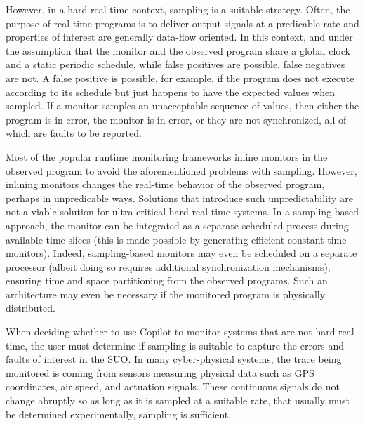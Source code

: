 However, in a hard real-time context, sampling is a suitable strategy.  Often,
the purpose of real-time programs is to deliver output signals at a predicable
rate and properties of interest are generally data-flow oriented.  In this
context, and under the assumption that the monitor and the observed program
share a global clock and a static periodic schedule, while false positives are
possible, false negatives are not.  A false positive is possible, for example,
if the program does not execute according to its schedule but just happens to
have the expected values when sampled.  If a monitor samples an unacceptable
sequence of values, then either the program is in error, the monitor is in
error, or they are not synchronized, all of which are faults to be reported.

Most of the popular runtime monitoring frameworks inline monitors in
the observed program to avoid the aforementioned problems with
sampling.  However, inlining monitors changes the real-time behavior
of the observed program, perhaps in unpredicable ways.
Solutions that
introduce such unpredictability are not a viable solution for
ultra-critical hard real-time systems.  In a sampling-based approach,
the monitor can be integrated as a separate scheduled process during
available time slices (this is made possible by generating efficient
constant-time monitors).  Indeed, sampling-based monitors may even be
scheduled on a separate processor (albeit doing so requires additional
synchronization mechanisms), ensuring time and space partitioning from
the observed programs.  Such an architecture may even be necessary if
the monitored program is physically distributed.

When deciding whether to use Copilot to monitor systems that are not hard real-time, the user must determine if
sampling is suitable to capture the errors and faults of interest in the  SUO. In many cyber-physical systems, the trace being monitored is
coming from sensors measuring physical data such as GPS coordinates, air speed, and actuation signals. These continuous signals do not
change abruptly so as long as it is sampled at a suitable rate, that usually must be determined experimentally, sampling is sufficient.



